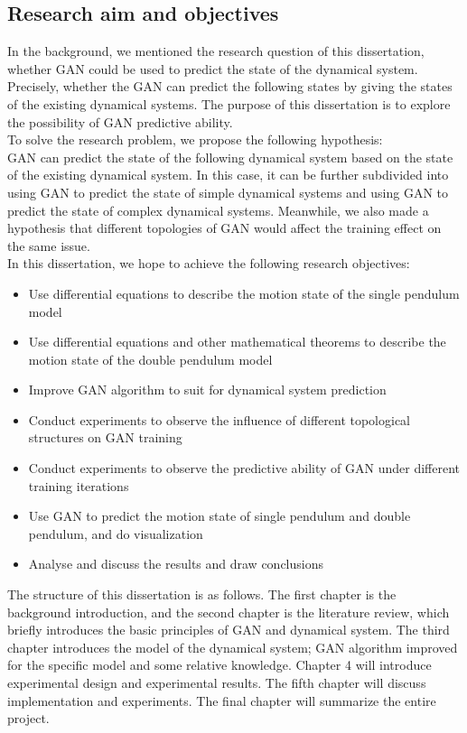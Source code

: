 \documentclass[11pt,a4paper]{article}
\begin{document}
\subsection{Research aim and objectives}
In the background, we mentioned the research question of this dissertation, whether GAN could be used to predict the state of the dynamical system. Precisely, whether the GAN can predict the following states by giving the states of the existing dynamical systems. The purpose of this dissertation is to explore the possibility of GAN predictive ability.
\\
\newline
To solve the research problem, we propose the following hypothesis:
\\
GAN can predict the state of the following dynamical system based on the state of the existing dynamical system. In this case, it can be further subdivided into using GAN to predict the state of simple dynamical systems and using GAN to predict the state of complex dynamical systems. Meanwhile, we also made a hypothesis that different topologies of GAN would affect the training effect on the same issue.
\\
In this dissertation, we hope to achieve the following research objectives:
\begin{itemize}
    \item Use differential equations to describe the motion state of the single pendulum model
    \item Use differential equations and other mathematical theorems to describe the motion state of the double pendulum model
    \item Improve GAN algorithm to suit for dynamical system prediction
    \item Conduct experiments to observe the influence of different topological structures on GAN training
    \item Conduct experiments to observe the predictive ability of GAN under different training iterations
    \item Use GAN to predict the motion state of single pendulum and double pendulum, and do visualization
    \item Analyse and discuss the results and draw conclusions
\end{itemize}
The structure of this dissertation is as follows. The first chapter is the background introduction, and the second chapter is the literature review, which briefly introduces the basic principles of GAN and dynamical system. The third chapter introduces the model of the dynamical system; GAN algorithm improved for the specific model and some relative knowledge. Chapter 4 will introduce experimental design and experimental results. The fifth chapter will discuss implementation and experiments. The final chapter will summarize the entire project.
\newpage
\end{document}
